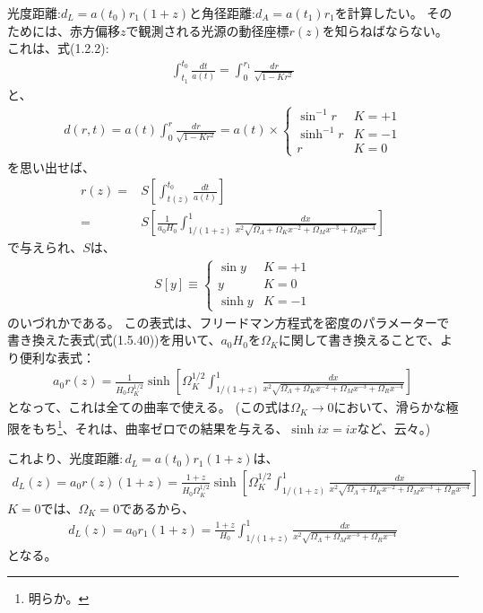 \documentclass[11pt]{ltjsarticle}
\theoremstyle{plain}
\theoremstyle{break}
\begin{document}
光度距離:$d_L = a(t_0) r_1 (1+z)$と角径距離:$d_A =a(t_1) r_1$を計算したい。
そのためには、赤方偏移$z$で観測される光源の動径座標$r(z)$を知らねばならない。
これは、式(1.2.2):
\begin{align}
  \int_{t_{1}}^{t_{0}} \frac{d t}{a(t)}=\int_{0}^{r_{1}} \frac{d r}{\sqrt{1-K r^{2}}}
\end{align}%
と、
\begin{align}
   d(r, t)=a(t) \int_{0}^{r} \frac{d r}{\sqrt{1-K r^{2}}}=a(t) \times \left\{\begin{array}{ll}{\sin ^{-1} r} & {K=+1} \\ {\sinh ^{-1} r} & {K=-1} \\ {r} & {K=0}\end{array}\right.
\end{align}%
を思い出せば、
\begin{align}
  r(z) 
    =& S\left[\int_{t(z)}^{t_{0}} \frac{d t}{a(t)}\right] \\
    =& S\left[\frac{1}{a_{0} H_{0}} \int_{1 /(1+z)}^{1} \frac{d x}{x^{2} \sqrt{\Omega_{\Lambda}+\Omega_{K} x^{-2}+\Omega_{M} x^{-3}+\Omega_{R} x^{-4}}}\right]
\end{align}%
で与えられ、$S$は、
\begin{align}
  S[y] \equiv \left\{\begin{array}{ll}{\sin y} & {K=+1} \\ {y} & {K=0} \\ {\sinh y} & {K=-1}\end{array}\right.
\end{align}%
のいづれかである。
この表式は、フリードマン方程式を密度のパラメーターで書き換えた表式(式(1.5.40))を用いて、$a_0 H_0$を$\Omega_{K}$に関して書き換えることで、より便利な表式：
\begin{align}
  a_{0} r(z)=\frac{1}{H_{0} \Omega_{K}^{1 / 2}} \sinh \left[\Omega_{K}^{1 / 2} \int_{1 /(1+z)}^{1} \frac{d x}{x^{2} \sqrt{\Omega_{\Lambda}+\Omega_{K} x^{-2}+\Omega_{M} x^{-3}+\Omega_{R} x^{-4}}}\right]
\end{align}%
となって、これは全ての曲率で使える。
(この式は$\Omega_{K} \to 0$において、滑らかな極限をもち\footnote{明らか。}、それは、曲率ゼロでの結果を与える、$\sinh ix = ix $など、云々。)

これより、光度距離$:d_L = a(t_0) r_1 (1+z)$は、
\begin{align}
  d_{L}(z)=a_{0} r(z)(1+z)=\frac{1+z}{H_{0} \Omega_{K}^{1 / 2}} \sinh \left[\Omega_{K}^{1 / 2} \int_{1 /(1+z)}^{1} \frac{d x}{x^{2} \sqrt{\Omega_{\Lambda}+\Omega_{K} x^{-2}+\Omega_{M} x^{-3}+\Omega_{R} x^{-4}}}\right]
\end{align}%
$K=0$では、$\Omega_{K} = 0$であるから、
\begin{align}
  d_{L}(z)=a_{0} r_{1}(1+z)=\frac{1+z}{H_{0}} \int_{1 /(1+z)}^{1} \frac{d x}{x^{2} \sqrt{\Omega_{\Lambda}+\Omega_{M} x^{-3}+\Omega_{R} x^{-4}}}
\end{align}%
となる。
\end{document}

